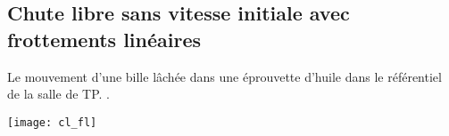 \documentclass[../main/main.tex]{subfiles}
\begin{document}
\subsection{Chute libre sans vitesse initiale avec frottements linéaires}
\hspace*{-0.75cm}
\begin{minipage}{0.65\linewidth}
    \begin{enumerate}[label=\sqenumi]
         Le mouvement d'une bille lâchée dans une
            éprouvette d'huile dans le référentiel de la salle de TP.
        .
    \end{enumerate}
\end{minipage}
\hfill
\begin{minipage}{0.30\linewidth}
    \begin{center}
        \texttt{[image: cl\_fl]}
    \end{center}
\end{minipage}
\end{document}
